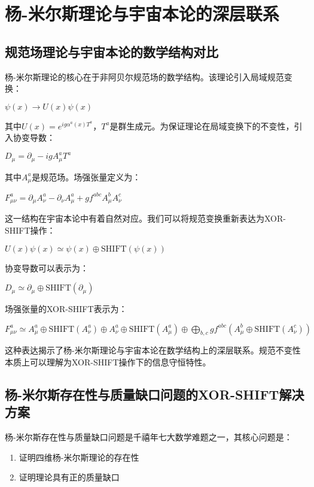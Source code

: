 \chapter{杨-米尔斯理论与宇宙本论的深层联系}

\section{规范场理论与宇宙本论的数学结构对比}

杨-米尔斯理论的核心在于非阿贝尔规范场的数学结构。该理论引入局域规范变换：

$\psi(x) \rightarrow U(x)\psi(x)$

其中$U(x) = e^{ig\alpha^a(x)T^a}$，$T^a$是群生成元。为保证理论在局域变换下的不变性，引入协变导数：

$D_\mu = \partial_\mu - igA_\mu^a T^a$

其中$A_\mu^a$是规范场。场强张量定义为：

$F_{\mu\nu}^a = \partial_\mu A_\nu^a - \partial_\nu A_\mu^a + gf^{abc}A_\mu^b A_\nu^c$

这一结构在宇宙本论中有着自然对应。我们可以将规范变换重新表达为XOR-SHIFT操作：

$U(x)\psi(x) \simeq \psi(x) \oplus \text{SHIFT}(\psi(x))$

协变导数可以表示为：

$D_\mu \simeq \partial_\mu \oplus \text{SHIFT}(\partial_\mu)$

场强张量的XOR-SHIFT表示为：

$F_{\mu\nu}^a \simeq A_\mu^a \oplus \text{SHIFT}(A_\nu^a) \oplus A_\nu^a \oplus \text{SHIFT}(A_\mu^a) \oplus \bigoplus_{b,c} g f^{abc} (A_\mu^b \oplus \text{SHIFT}(A_\nu^c))$

这种表达揭示了杨-米尔斯理论与宇宙本论在数学结构上的深层联系。规范不变性本质上可以理解为XOR-SHIFT操作下的信息守恒特性。

\section{杨-米尔斯存在性与质量缺口问题的XOR-SHIFT解决方案}

杨-米尔斯存在性与质量缺口问题是千禧年七大数学难题之一，其核心问题是：

\begin{enumerate}
  \item 证明四维杨-米尔斯理论的存在性
  \item 证明理论具有正的质量缺口
\end{enumerate}

